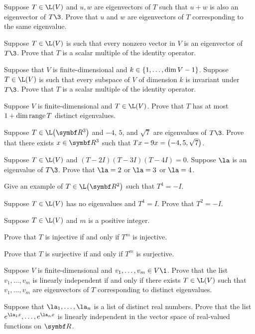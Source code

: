 \begin{exercises}
\exercise
Suppose $T \in \L(V)$ and $u, w$ are eigenvectors of $T$ such that $u+w$ is also an eigenvector of $T\3$. Prove that $u$ and $w$ are eigenvectors of $T$ corresponding to the same eigenvalue.


\exercise
Suppose $T \in \L(V)$ is such that every nonzero vector in $V$ is an
eigenvector of~$T\3$.  Prove that $T$ is a scalar multiple of the identity operator.\label{388}


\exercise
Suppose that $V$ is finite-dimensional and $k \in \br{1, \ldots,\dim V - 1}$. Suppose $T \in \L(V)$ is such that every subspace of $V$ of dimension $k$ is invariant under~$T\3$.  Prove that $T$ is a scalar multiple of the identity operator.


\exercise
Suppose $V$ is finite-dimensional and $T \in \L(V)$.  Prove that $T$ has at most $1 + \dim \ran T$ distinct eigenvalues.


\exercise
Suppose $T \in \L\paren[\big]{\R{3}}$ and $-4$, $5$, and $ \sqrt{7}$ are eigenvalues of $T\3$. Prove that there exists $x \in \R{3}$ such that
$
Tx - 9x = \paren[\big]{-4, 5, \sqrt{7}}$.


\exercise
Suppose $T \in \L(V)$ and $(T-2I) (T-3 I) (T-4 I) = 0$. Suppose $\la$ is an eigenvalue of $T\3$. Prove that $\la = 2$ or $\la = 3$ or $\la = 4$.


\exercise
Give an example of $T \in \L\paren[\big]{\R2}$ such that $T^4 = -I$.


\exercise
Suppose $T \in \L(V)$ has no eigenvalues and $T^4 = I$. Prove that $T^2 = -I$.


\exercise
Suppose $T \in \L(V)$ and $m$ is a positive integer.
\begin{subtheorem}
\item
Prove that $T$ is injective if and only if $T^m$ is injective.
\item
Prove that $T$ is surjective if and only if $T^m$ is surjective.
\end{subtheorem}
\exercisesubtheoremend


\exercise
Suppose $V$ is finite-dimensional and $v_1, \dots, v_m \in V\1$. Prove that the list $v_1, \dots, v_m$ is linearly independent if and only if there exists $T \in \L(V)$ such that $v_1, \dots, v_m$ are eigenvectors of $T$ corresponding to distinct \mbox{eigenvalues}.


\exercise
Suppose that $\la_1, \dots, \la_n$ is a list of distinct real numbers. Prove that the list $e^{\la_1 x}, \dots, e^{\la_n x}$ is linearly independent in the vector space of real-valued functions on $\R{}$.



\end{exercises}
